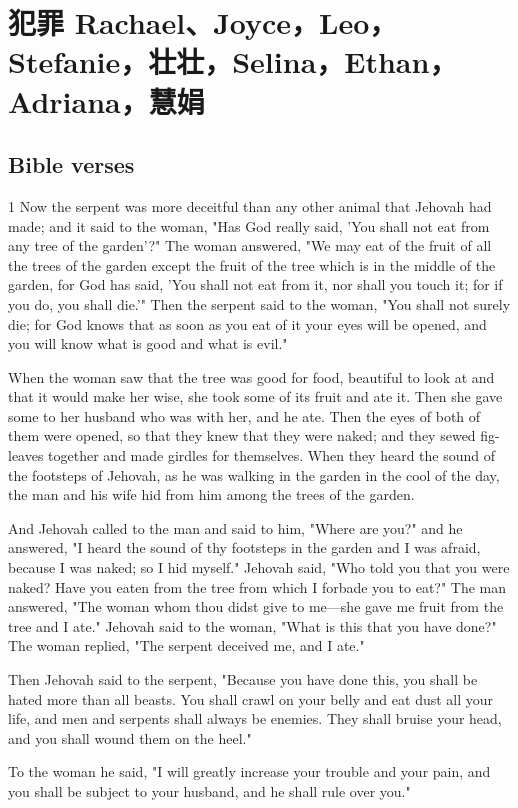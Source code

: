 \chapter{犯罪 Rachael、Joyce，Leo，Stefanie，壮壮，Selina，Ethan，Adriana，慧娟}
\iffalse
\section{Bible verses}
1 Now the serpent was more deceitful than any other animal that Jehovah had made; and it said to the woman, "Has God really said, 'You shall not eat from any tree of the garden'?" The woman answered, "We may eat of the fruit of all the trees of the garden except the fruit of the tree which is in the middle of the garden, for God has said, 'You shall not eat from it, nor shall you touch it; for if you do, you shall die.'" Then the serpent said to the woman, "You shall not surely die; for God knows that as soon as you eat of it your eyes will be opened, and you will know what is good and what is evil."


When the woman saw that the tree was good for food, beautiful to look at and that it would make her wise, she took some of its fruit and ate it. Then she gave some to her husband who was with her, and he ate.
Then the eyes of both of them were opened, so that they knew that they were naked; and they sewed fig-leaves together and made girdles for themselves. When they heard the sound of the footsteps of Jehovah, as he was walking in the garden in the cool of the day, the man and his wife hid from him among the trees of the garden.

And Jehovah called to the man and said to him, "Where are you?" and he answered, "I heard the sound of thy footsteps in the garden and I was afraid, because I was naked; so I hid myself." Jehovah said, "Who told you that you were naked? Have you eaten from the tree from which I forbade you to eat?" The man answered, "The woman whom thou didst give to me—she gave me fruit from the tree and I ate." Jehovah said to the woman, "What is this that you have done?" The woman replied, "The serpent deceived me, and I ate."

Then Jehovah said to the serpent, "Because you have done this, you shall be hated more than all beasts. You shall crawl on your belly and eat dust all your life, and men and serpents shall always be enemies. They shall bruise your head, and you shall wound them on the heel."

To the woman he said, "I will greatly increase your trouble and your pain, and you shall be subject to your husband, and he shall rule over you."

